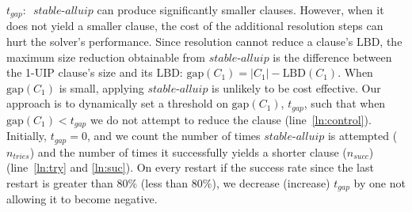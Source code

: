 \documentclass[runningheads]{llncs}
\newcommand{\oneuip}{1-UIP\xspace}
\newcommand{\LBD}{\text{LBD}\xspace}
\newcommand{\gap}{\text{gap}}
\newcommand{\tgap}{t_{\mathit{gap}}}
\newcommand{\ntries}{n_{\mathit{tries}}}
\newcommand{\nsuc}{n_{\mathit{succ}}}
\newcommand{\stablealluip}{\textit{stable-alluip}\xspace}
\begin{document}
\noindent\textbf{$\tgap$}:\,\,
$\stablealluip$ can produce significantly smaller clauses. However,
when it does not yield a smaller clause, the cost of the additional
resolution steps can hurt the solver's performance. Since resolution
cannot reduce a clause's $\LBD$, the maximum size reduction obtainable
from $\stablealluip$ is the difference between the \oneuip clause's
size and its $\LBD$: $\gap(C_1) = |C_1| - \LBD(C_1)$. When $\gap(C_1)$
is small, applying $\stablealluip$ is unlikely to be cost
effective. Our approach is to dynamically set a threshold on
$\gap(C_1)$, $\tgap$, such that when $\gap(C_1) < \tgap$ we do not
attempt to reduce the clause (line~\ref{ln:control}). Initially,
$\tgap = 0$, and we count the number of times $\stablealluip$ is
attempted ($\ntries$) and the number of times it successfully yields a
shorter clause ($\nsuc$) (line~\ref{ln:try} and \ref{ln:suc}). On
every restart if the success rate since the last restart is greater
than 80\% (less than 80\%), we decrease (increase) $\tgap$ by one
not allowing it to become negative.
\end{document}
